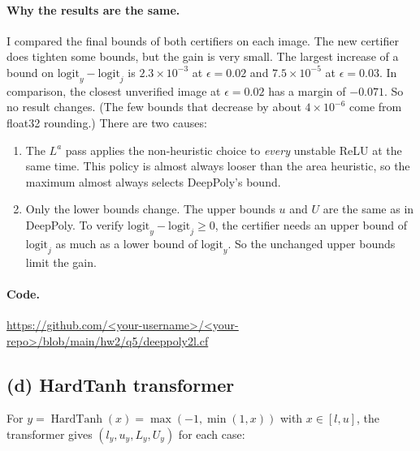 \paragraph{Why the results are the same.}
I compared the final bounds of both certifiers on each image. The new
certifier does tighten some bounds, but the gain is very small. The
largest increase of a bound on $\text{logit}_y-\text{logit}_j$ is
$2.3\times10^{-3}$ at $\epsilon=0.02$ and $7.5\times10^{-5}$ at
$\epsilon=0.03$. In comparison, the closest unverified image at
$\epsilon=0.02$ has a margin of $-0.071$. So no result changes.
(The few bounds that decrease by about $4\times10^{-6}$ come from
float32 rounding.) There are two causes:
\begin{enumerate}
  \item The $L^a$ pass applies the non-heuristic choice to
        \emph{every} unstable ReLU at the same time. This policy is
        almost always looser than the area heuristic, so the maximum
        almost always selects DeepPoly's bound.
  \item Only the lower bounds change. The upper bounds $u$ and $U$ are
        the same as in DeepPoly. To verify
        $\text{logit}_y-\text{logit}_j\ge0$, the certifier needs an
        upper bound of $\text{logit}_j$ as much as a lower bound of
        $\text{logit}_y$. So the unchanged upper bounds limit the gain.
\end{enumerate}

\paragraph{Code.}
\url{https://github.com/<your-username>/<your-repo>/blob/main/hw2/q5/deeppoly2l.cf}

\subsection*{(d) HardTanh transformer}

For $y=\operatorname{HardTanh}(x)=\max(-1,\min(1,x))$ with
$x\in[l,u]$, the transformer gives $(l_y,u_y,L_y,U_y)$ for each case:

